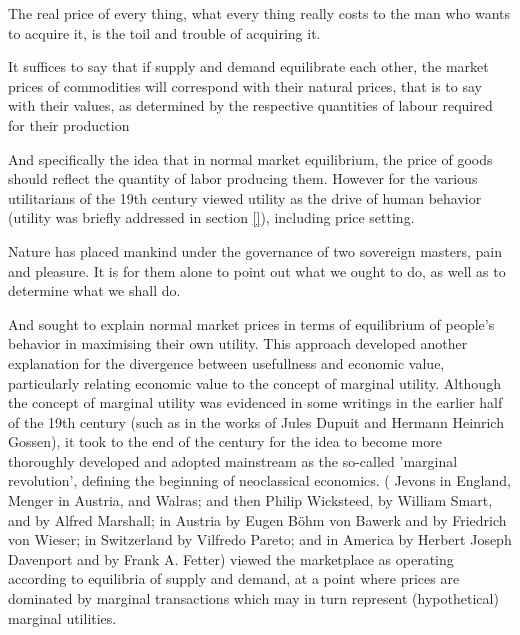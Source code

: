 \begin{displayquote}
The real price of every thing, what every thing really costs to the man who wants to acquire it, is the toil and trouble of acquiring it.\cite{Smith1Gutenberg}
\end{displayquote}

\begin{displayquote}
It suffices to say that if supply and demand equilibrate each other, the market prices of commodities will correspond with their natural prices, that is to say with their values, as determined by the respective quantities of labour required for their production \cite{marx1910value}
\end{displayquote}

And specifically the idea that in normal market equilibrium, the price of goods should reflect the quantity of labor producing them.
However for the various utilitarians of the 19th century viewed utility as the drive of human behavior (utility was briefly addressed in section \ref{}), including price setting.

\begin{displayquote}
Nature has placed mankind under the governance of two sovereign masters, pain and pleasure.
It is for them alone to point out what we ought to do, as well as to determine what we shall do.
\cite{bentham1823introduction}
\end{displayquote}

And sought to explain normal market prices in terms of equilibrium of people's behavior in maximising their own utility.
This approach developed another explanation for the divergence between usefullness and economic value, particularly relating economic value to the concept of marginal utility.
Although the concept of marginal utility was evidenced in some writings in the earlier half of the 19th century (such as in the works of Jules Dupuit and Hermann Heinrich Gossen), it took to the end of the century for the idea to become more thoroughly developed and adopted mainstream as the so-called 'marginal revolution', defining the beginning of neoclassical economics.
( Jevons in England, Menger in Austria, and Walras; and then Philip Wicksteed, by William Smart, and by Alfred Marshall; in Austria by Eugen Böhm von Bawerk and by Friedrich von Wieser; in Switzerland by Vilfredo Pareto; and in America by Herbert Joseph Davenport and by Frank A. Fetter)
viewed the marketplace as operating according to equilibria of supply and demand, at a point where prices are dominated by marginal transactions which may in turn represent (hypothetical) marginal utilities.

